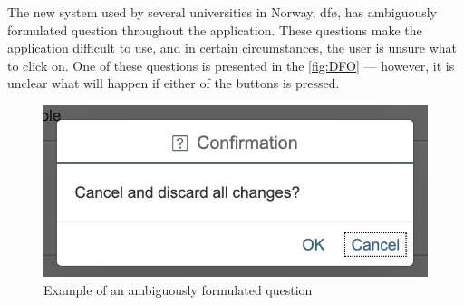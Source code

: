 The new system used by several universities in Norway, \gls{dfø}, has ambiguously formulated question throughout the application. These questions make the application difficult to use, and in certain circumstances, the user is unsure what to click on. One of these questions is presented in the \autoref{fig:DFO} --- however, it is unclear what will happen if either of the buttons is pressed.

\begin{figure}
    \centering
    \includegraphics[scale=0.65]{figures/DFO.jpg}
    \caption{Example of an ambiguously formulated question}
    \label{fig:DFO}
\end{figure}

